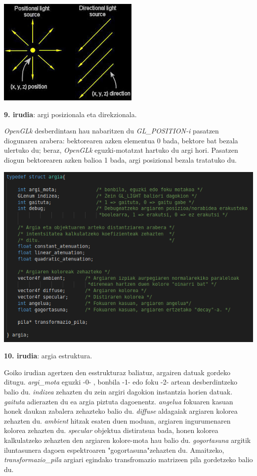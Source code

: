 \documentclass[12pt]{article}
\newcommand{\aldagai}[1] {\textit{#1}}
\begin{document}
\begin{center}
\includegraphics[scale=0.7]{argia_posdirek.jpeg}

\textbf{9. irudia}: argi posizionala eta direkzionala.
\end{center}

\aldagai{OpenGLk} desberdintasn hau nabaritzen du \aldagai{GL\_POSITION-i} pasatzen diogunaren arabera: bektorearen azken elementua 0 bada, bektore bat bezala ulertuko du; beraz, \aldagai{OpenGLk} eguzki-motatzat hartuko du argi hori. Pasatzen diogun bektorearen azken balioa 1 bada, argi posizional bezala tratatuko du.\\

\begin{center}
\includegraphics[scale=2.5]{argia_estruktura.png}

\textbf{10. irudia}: argia estruktura.
\end{center}

Goiko irudian agertzen den esstrukturaz baliatuz, argairen datuak gordeko ditugu. \aldagai{argi\_mota} eguzki -0- , bonbila -1- edo foku -2- artean desberdintzeko balio du. \aldagai{indizea} zehazten du zein argiri dagokion instantzia horien datuak. \aldagai{gaituta} adierazten du ea argia piztuta dagoenentz. \aldagai{angelua} fokuaren kasuan honek daukan zabalera zehazteko balio du. \aldagai{diffuse} aldagaiak argiaren kolorea zehazten du. \aldagai{ambient} hitzak esaten duen moduan, argiaren ingurumenaren kolorea zehazten du. \aldagai{specular} objektua distiratsua bada, honen kolorea kalkulatzeko zehazten den argiaren kolore-mota hau balio du. \aldagai{gogortasuna} argitik iluntasunera dagoen espektroaren "gogortasuna"zehazten du. Amaitzeko, \aldagai{transformazio\_pila} argiari egindako transfromazio matrizeen pila gordetzeko balio du.\\
\end{document}
